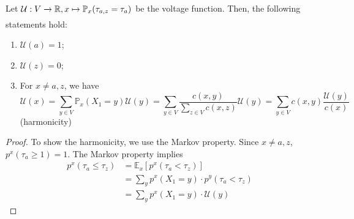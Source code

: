 \begin{lem}
  Let $\mathcal{U}: V \myxrightarrow[]{} \mathbb{R}, x \mapsto \mathbb{P}_x(\tau_{a,z}=\tau_a)$ be the voltage function. Then, the following statements hold:
  \begin{enumerate}
      \item \(\mathcal{U}(a)=1\);
      \item \(\mathcal{U}(z)=0\);
      \item For $x\neq a,z$, we have \[\mathcal{U}(x) = \sum_{y\in V}^{} \mathbb{P}_x(X_1=y) \mathcal{U}(y) = \sum_{y\in V}^{} \frac{c(x,y)}{\sum_{z\in V} c(x,z) }\mathcal{U}(y) = \sum_{y\in V}^{} c(x,y) \frac{\mathcal{U}(y)}{c(x)}\] (harmonicity)
  \end{enumerate}
\end{lem}
\begin{proof}
    To show the harmonicity, we use the Markov property. Since \(x \neq a,z\), \(p^x(\tau_a\geq 1)=1\). The Markov property implies 
    \begin{align*}
      p^x(\tau_a \leq \tau_z) &= \mathbb{E}_x \left[ p^x(\tau_a < \tau_z)\right] \\
                              &= \sum_y p^x(X_1=y)\cdot p^y(\tau_a < \tau_z) \\
                              &= \sum_y p^x(X_1=y) \cdot \mathcal{U}(y)
    \end{align*}    
\end{proof}

